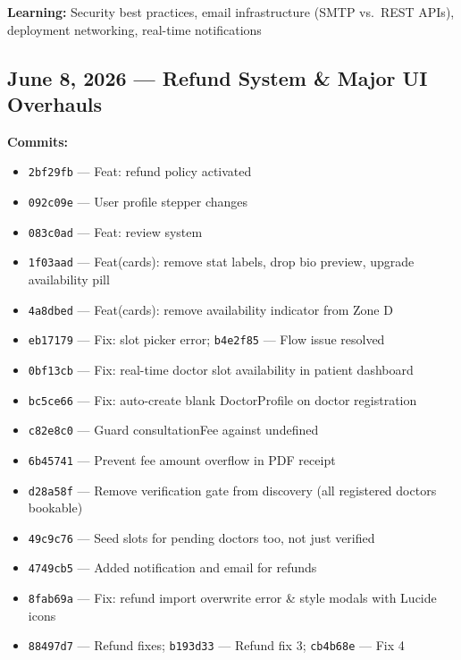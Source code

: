 \documentclass[11pt,a4paper]{article}
\begin{document}
\textbf{Learning:} Security best practices, email infrastructure (SMTP vs.\ REST APIs),
deployment networking, real-time notifications

\subsection{June 8, 2026 — Refund System \& Major UI Overhauls}

\textbf{Commits:}
\begin{itemize}
  \item \texttt{2bf29fb} — Feat: refund policy activated
  \item \texttt{092c09e} — User profile stepper changes
  \item \texttt{083c0ad} — Feat: review system
  \item \texttt{1f03aad} — Feat(cards): remove stat labels, drop bio preview, upgrade availability pill
  \item \texttt{4a8dbed} — Feat(cards): remove availability indicator from Zone D
  \item \texttt{eb17179} — Fix: slot picker error; \texttt{b4e2f85} — Flow issue resolved
  \item \texttt{0bf13cb} — Fix: real-time doctor slot availability in patient dashboard
  \item \texttt{bc5ce66} — Fix: auto-create blank DoctorProfile on doctor registration
  \item \texttt{c82e8c0} — Guard consultationFee against undefined
  \item \texttt{6b45741} — Prevent fee amount overflow in PDF receipt
  \item \texttt{d28a58f} — Remove verification gate from discovery (all registered doctors bookable)
  \item \texttt{49c9c76} — Seed slots for pending doctors too, not just verified
  \item \texttt{4749cb5} — Added notification and email for refunds
  \item \texttt{8fab69a} — Fix: refund import overwrite error \& style modals with Lucide icons
  \item \texttt{88497d7} — Refund fixes; \texttt{b193d33} — Refund fix 3; \texttt{cb4b68e} — Fix 4
\end{itemize}
\end{document}
